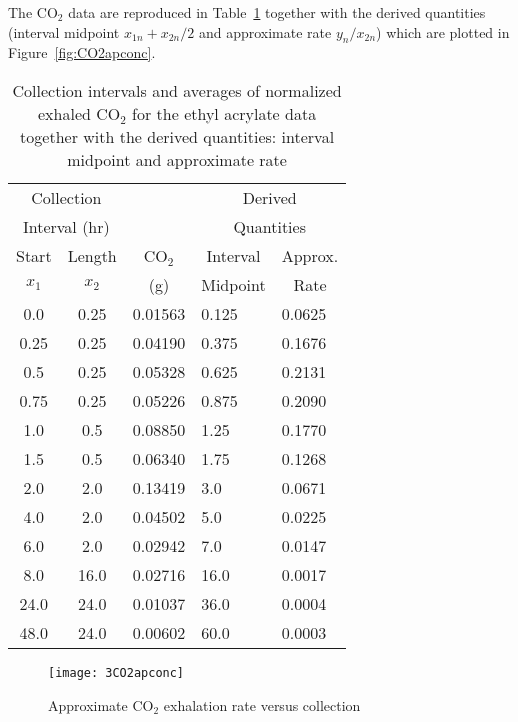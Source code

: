 \begin{example}\label{eth:2}
  The CO$_{2}$ data are reproduced in Table~\ref{tbl:CO2rate} together
  with the derived quantities (interval midpoint
  $x_{1n}+ x_{2n} / 2$ and approximate rate
  $y_n / x_{2n}$) which are plotted in Figure~\ref{fig:CO2apconc}.
  \begin{table}
    \caption{
      Collection intervals and averages of normalized exhaled CO$_{2}$
      for the ethyl acrylate data together with the derived quantities:
      interval midpoint and approximate rate }\label{tbl:CO2rate}
    \begin{center}
      \begin{tabular}{cclll} \hline
        \multicolumn{2}{c}{Collection} & &
        \multicolumn{2}{c}{Derived}\\ \multicolumn{2}{c}{Interval (hr)} &
        & \multicolumn{2}{c}{Quantities}\\ \multicolumn{1}{c}{Start} &
        \multicolumn{1}{c}{Length} & \multicolumn{1}{c}{CO$_{2}$} &
        \multicolumn{1}{c}{Interval} & \multicolumn{1}{c}{Approx.}\\
        \multicolumn{1}{c}{$x_{1}$} & {$x_{2}$} & \multicolumn{1}{c}{(g)}
        & \multicolumn{1}{c}{Midpoint} & \multicolumn{1}{c}{Rate}\\ \hline
        0.0&0.25&0.01563&0.125&0.0625\\ 0.25&0.25&0.04190&0.375&0.1676\\
        0.5&0.25&0.05328&0.625&0.2131\\ 0.75&0.25&0.05226&0.875&0.2090\\
        1.0&0.5&0.08850&1.25&0.1770\\ 1.5&0.5&0.06340&1.75&0.1268\\
        2.0&2.0&0.13419&3.0&0.0671\\ 4.0&2.0&0.04502&5.0&0.0225\\
        6.0&2.0&0.02942&7.0&0.0147\\ 8.0&16.0&0.02716&16.0&0.0017\\
        24.0&24.0&0.01037&36.0&0.0004\\ 48.0&24.0&0.00602&60.0&0.0003\\
        \hline
      \end{tabular}
    \end{center}
  \end{table}
  \begin{figure}
    \centerline{\texttt{[image: 3CO2apconc]}}%
    \caption{Approximate CO$_{2}$ exhalation rate versus collection
}
\end{figure}
\end{example}

